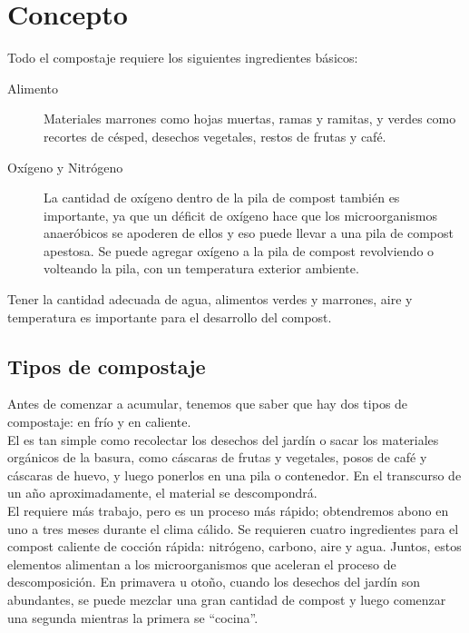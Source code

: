 \documentclass[../main.tex]{subfiles}
\begin{document}
\section{Concepto}

Todo el compostaje requiere los siguientes ingredientes básicos:

\begin{description}
    \item [Alimento] 
    Materiales marrones como hojas muertas, ramas y ramitas, y verdes como recortes de césped, desechos vegetales, restos de frutas y café.\\[-5pt]
    \item [Oxígeno y Nitrógeno] 
    La cantidad de oxígeno dentro de la pila de compost también es importante, ya que un déficit de oxígeno hace que los microorganismos anaeróbicos se apoderen de ellos y eso puede llevar a una pila de compost apestosa. Se puede agregar oxígeno a la pila de compost revolviendo o volteando la pila, con un temperatura exterior ambiente.\\[-5pt]
\end{description}

Tener la cantidad adecuada de agua, alimentos verdes y marrones, aire y temperatura es importante para el desarrollo del compost.

\subsection{Tipos de compostaje}

Antes de comenzar a acumular, tenemos que saber que hay dos tipos de compostaje: en frío y en caliente. \\

El  es tan simple como recolectar los desechos del jardín o sacar los materiales orgánicos de la basura, como cáscaras de frutas y vegetales, posos de café y cáscaras de huevo, y luego ponerlos en una pila o contenedor. En el transcurso de un año aproximadamente, el material se descompondrá.\\

El  requiere más trabajo, pero es un proceso más rápido; obtendremos abono en uno a tres meses durante el clima cálido. Se requieren cuatro ingredientes para el compost caliente de cocción rápida: nitrógeno, carbono, aire y agua. Juntos, estos elementos alimentan a los microorganismos que aceleran el proceso de descomposición. En primavera u otoño, cuando los desechos del jardín son abundantes, se puede mezclar una gran cantidad de compost y luego comenzar una segunda mientras la primera se \enquote{cocina}.\\
\end{document}
